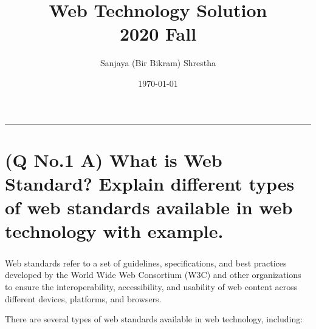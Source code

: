 \documentclass[11pt]{article}
\title{ Web Technology Solution\\2020 Fall}
\author{ Sanjaya (Bir Bikram) Shrestha }
\date{\today}
\begin{document}
\maketitle	
\pagestyle{fancy}

\tableofcontents
\pagebreak


\noindent\rule{\linewidth}{0.4pt}
\section{(Q No.1 A) What is Web Standard? Explain different types of web standards available in web technology with example. }
\subparagraph{}
Web standards refer to a set of guidelines, specifications, and best practices developed by the World Wide Web Consortium (W3C) and other organizations to ensure the interoperability, accessibility, and usability of web content across different devices, platforms, and browsers.

There are several types of web standards available in web technology, including:
\end{document}
